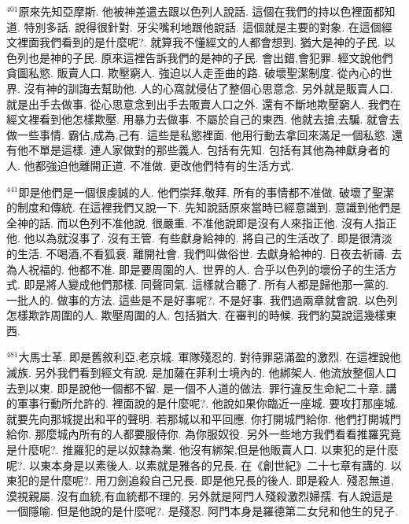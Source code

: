 \documentclass{book}
\begin{document}
$^{401}$原來先知亞摩斯.
他被神差遣去跟以色列人說話.
這個在我們的持以色裡面都知道.
特別多話.
說得很針對.
牙尖嘴利地跟他說話.
這個就是主要的對象.
在這個經文裡面我們看到的是什麼呢?.
就算我不懂經文的人都會想到.
猶大是神的子民.
以色列也是神的子民.
原來這裡告訴我們的是神的子民.
會出錯,會犯罪.
經文說他們貪圖私慾.
販賣人口.
欺壓窮人.
強迫以人走歪曲的路.
破壞聖潔制度.
從內心的世界.
沒有神的訓誨去幫助他.
人的心窩就侵佔了整個心思意念.
另外就是販賣人口.
就是出手去做事.
從心思意念到出手去販賣人口之外.
還有不斷地欺壓窮人.
我們在經文裡看到他怎樣欺壓.
用暴力去做事.
不屬於自己的東西.
他就去搶,去騙.
就會去做一些事情.
霸佔,成為,己有.
這些是私慾裡面.
他用行動去拿回來滿足一個私慾.
還有他不單是這樣.
連人家做對的那些義人.
包括有先知.
包括有其他為神獻身者的人.
他都強迫他離開正道.
不准做.
更改他們特有的生活方式.

$^{441}$即是他們是一個很虔誠的人.
他們崇拜,敬拜.
所有的事情都不准做.
破壞了聖潔的制度和傳統.
在這裡我們又說一下.
先知說話原來當時已經意識到.
意識到他們是全神的話.
而以色列不准他說.
很嚴重.
不准他說即是沒有人來指正他.
沒有人指正他.
他以為就沒事了.
沒有王管.
有些獻身給神的.
將自己的生活改了.
即是很清淡的生活.
不喝酒,不看狐衰.
離開社會.
我們叫做俗世.
去獻身給神的.
日夜去祈禱.
去為人祝福的.
他都不准.
即是要周圍的人.
世界的人.
合乎以色列的壞份子的生活方式.
即是將人變成他們那樣.
同聲同氣.
這樣就合聽了.
所有人都是歸他那一黨的.
一批人的.
做事的方法.
這些是不是好事呢?.
不是好事.
我們過兩章就會說.
以色列怎樣欺詐周圍的人.
欺壓周圍的人.
包括猶大.
在審判的時候.
我們約莫說這幾樣東西.

$^{481}$大馬士革.
即是舊敘利亞,老京城.
軍隊殘忍的.
對待罪惡滿盈的激烈.
在這裡說他滅族.
另外我們看到經文有說.
是加薩在菲利士境內的.
他綁架人.
他流放整個人口去到以東.
即是說他一個都不留.
是一個不人道的做法.
罪行違反生命紀二十章.
講的軍事行動所允許的.
裡面說的是什麼呢?.
他說如果你臨近一座城.
要攻打那座城.
就要先向那城提出和平的聲明.
若那城以和平回應.
你打開城門給你.
他們打開城門給你.
那麼城內所有的人都要服侍你.
為你服奴役.
另外一些地方我們看看推羅究竟是什麼呢?.
推羅犯的是以奴隸為業.
他沒有綁架,但是他販賣人口.
以東犯的是什麼呢?.
以東本身是以素後人.
以素就是雅各的兄長.
在《創世紀》二十七章有講的.
以東犯的是什麼呢?.
用刀劍追殺自己兄長.
即是他兄長的後人.
即是殺人.
殘忍無道,漠視親屬.
沒有血統,有血統都不理的.
另外就是阿門人殘殺激烈婦孺.
有人說這是一個隱喻.
但是他說的是什麼呢?.
是殘忍.
阿門本身是羅德第二女兒和他生的兒子.
\end{document}
